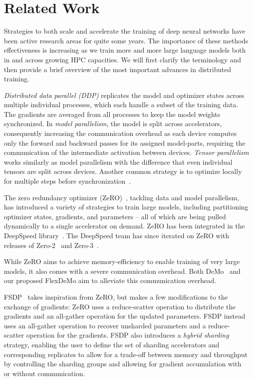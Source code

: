 \section{Related Work}
Strategies to both scale and accelerate the training of deep neural networks have been active research areas \cite{shoeybi2019megatron,rajbhandari2020zero} for quite some years. The importance of these methods effectiveness is increasing as we train more and more large language models both in and across growing HPC capacities. We will first clarify the terminology and then provide a brief overview of the most important advances in distributed training.

\emph{Distributed data parallel (DDP)} replicates the model and optimizer states across multiple individual processes, which each handle a subset of the training data. The gradients are averaged from all processes to keep the model weights synchronized.  
In \emph{model parallelism}, the model is split across accelerators, consequently increasing the communication overhead as each device computes only the forward and backward passes for its assigned model-parts, requiring the communication of the intermediate activation between devices.
\emph{Tensor parallelism} works similarly as model parallelism with the difference that even individual tensors are split across devices. Another common strategy is to optimize locally for multiple steps before synchronization~\cite{DBLP:conf/iclr/Stich19}.

The zero redundancy optimizer (ZeRO)~\cite{rajbhandari2020zero}, tackling data and model parallelism, has introduced a variety of strategies to train large models, including partitioning optimizer states, gradients, and parameters -- all of which are being pulled dynamically to a single accelerator on demand. ZeRO has been integrated in the DeepSpeed library~\cite{rasley2020deepspeed}. The DeepSpeed team has since iterated on ZeRO with releases of Zero-2~\cite{zero2} and Zero-3~\cite{zero3}.

While ZeRO aims to achieve memory-efficiency to enable training of very large models, it also comes with a severe communication overhead. Both DeMo~\cite{peng2024demodecoupledmomentumoptimization} and our proposed FlexDeMo aim to alleviate this communication overhead.

FSDP~\cite{zhao2023fsdp} takes inspiration from ZeRO, but makes a few modifications to the exchange of gradients: ZeRO uses a reduce-scatter operation to distribute the gradients and an all-gather operation for the updated parameters. FSDP instead uses an all-gather operation to recover unsharded parameters and a reduce-scatter operation for the gradients.
FSDP also introduces a \emph{hybrid sharding} strategy, enabling the user to define the set of sharding accelerators and corresponding replicates to allow for a trade-off between memory and throughput by controlling the sharding groups and allowing for gradient accumulation with or without communication.


